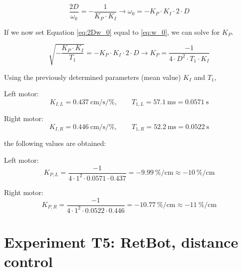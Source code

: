 \documentclass[12pt, oneside, a4paper]{scrreprt}
\begin{document}
            \begin{equation}
                \frac{2D}{\omega _0 } = - \frac{1}{K_P \cdot K_I} \rightarrow \omega_0 = - K_P \cdot K_I \cdot 2 \cdot D
                \label{eq:2Dw_0}
            \end{equation}
            
            If we now set Equation \ref{eq:2Dw_0} equal to \ref{eq:w_0}, we can solve for $K_P$.

            \begin{equation}
                \sqrt{-\frac{K_P \cdot K_I}{T_1}} = - K_P \cdot K_I \cdot 2 \cdot D \rightarrow K_P = \frac{-1}{4 \cdot D^2 \cdot T_1\cdot K_I}
            \end{equation}\label{eq:K_P}

            Using the previously determined parameters (mean value) $K_I$ and $T_1$, 

            Left motor:
            \begin{equation}
                K_{I,L} = \qty{0.437}{\centi\metre\per\second\per\percent}, \qquad
                T_{1,L} = \qty{57.1}{\milli\second} = \qty{0.0571}{\second}
            \end{equation}

            Right motor:
            \begin{equation}
                K_{I,R} = \qty{0.446}{\centi\metre\per\second\per\percent}, \qquad
                T_{1,R} = \qty{52.2}{\milli\second} = \qty{0.0522}{\second}
            \end{equation}

            the following values are obtained:

            Left motor:
            \begin{equation}
                K_{P,L} = \frac{-1}{4 \cdot 1^2 \cdot 0.0571 \cdot 0.437} = \qty{-9.99}{\percent\per\cm} \approx \qty{-10}{\percent\per\cm}
            \end{equation}

            Right motor:
            \begin{equation}
                K_{P,R} = \frac{-1}{4 \cdot 1^2 \cdot 0.0522 \cdot 0.446} = \qty{-10.77}{\percent\per\cm} \approx \qty{-11}{\percent\per\cm}
            \end{equation}
    


    \chapter{Experiment T5: RetBot, distance control}\label{ch:ExperimentT5}
\end{document}
